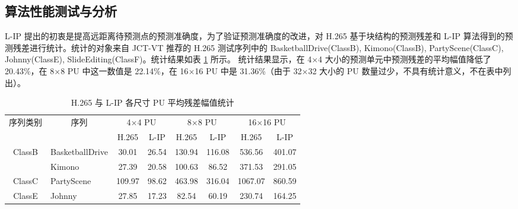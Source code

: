 \subsection{算法性能测试与分析}
L-IP 提出的初衷是提高远距离待预测点的预测准确度，为了验证预测准确度的改进，对 H.265 基于块结构的预测残差和 L-IP 算法得到的预测残差进行统计。统计的对象来自 JCT-VT 推荐的 H.265 测试序列中的 BasketballDrive(ClassB), Kimono(ClassB), PartyScene(ClassC), Johnny(ClassE), SlideEditing(ClassF)。统计结果如表 \ref{tab:L-IPResidualReduction} 所示。
统计结果显示，在 4$\times$4 大小的预测单元中预测残差的平均幅值降低了 20.43\%，在 8$\times$8 PU 中这一数值是 22.14\%，在 16$\times$16 PU 中是 31.36\%（由于 32$\times$32 大小的 PU 数量过少，不具有统计意义，不在表中列出）。
\begin{table}[htb]
    \centering
    \caption{H.265 与 L-IP 各尺寸 PU 平均残差幅值统计}
    \label{tab:L-IPResidualReduction}
    \begin{tabular}{@{}clcccccc@{}}
        \toprule
        \multirow{2}{*}{序列类别}                & \multicolumn{1}{c}{\multirow{2}{*}{序列}} & \multicolumn{2}{c}{4$\times$4 PU} & \multicolumn{2}{c}{8$\times$8 PU} & \multicolumn{2}{c}{16$\times$16 PU}                             \\ \cmidrule(l){3-8}
                                                 & \multicolumn{1}{c}{}                      & H.265                             & L-IP                              & H.265                               & L-IP   & H.265   & L-IP   \\ \midrule
        \multirow{2}{*}{ClassB}                  & BasketballDrive                           & 30.01                             & 26.54                             & 130.94                              & 116.08 & 536.56  & 401.07 \\
                                                 & Kimono                                    & 27.39                             & 20.58                             & 100.63                              & 86.52  & 371.53  & 291.05 \\
        ClassC                                   & PartyScene                                & 109.97                            & 98.62                             & 463.98                              & 316.04 & 1067.07 & 860.59 \\
        ClassE                                   & Johnny                                    & 27.85                             & 17.23                             & 82.54                               & 60.19  & 230.74  & 164.25 \\

\end{tabular}
\end{table}
